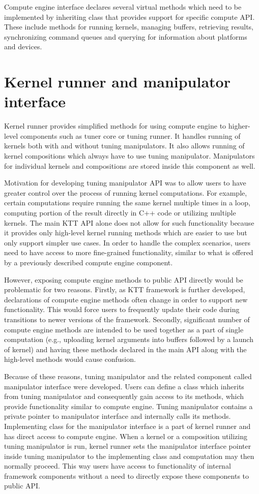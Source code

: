 \documentclass
[
    digital, %
    oneside, %
    table, %
    nolof, %
    nolot, %
    nocover %
]{fithesis3}
\begin{document}
Compute engine interface declares several virtual methods which need to be implemented by inheriting class that provides support for specific compute
API. These include methods for running kernels, managing buffers, retrieving results, synchronizing command queues and querying for information about
platforms and devices.

\section{Kernel runner and manipulator interface}
Kernel runner provides simplified methods for using compute engine to higher-level components such as tuner core or tuning runner. It handles running of
kernels both with and without tuning manipulators. It also allows running of kernel compositions which always have to use tuning manipulator. Manipulators
for individual kernels and compositions are stored inside this component as well.

Motivation for developing tuning manipulator API was to allow users to have greater control over the process of running kernel computations.
For example, certain computations require running the same kernel multiple times in a loop, computing portion of the result directly in C++ code or
utilizing multiple kernels. The main KTT API alone does not allow for such functionality because it provides only high-level kernel running methods which
are easier to use but only support simpler use cases. In order to handle the complex scenarios, users need to have access to more fine-grained
functionality, similar to what is offered by a previously described compute engine component.

However, exposing compute engine methods to public API directly would be problematic for two reasons. Firstly, as KTT framework is further developed,
declarations of compute engine methods often change in order to support new functionality. This would force users to frequently update their code
during transitions to newer versions of the framework. Secondly, significant number of compute engine methods are intended to be used together as a part
of single computation (e.g., uploading kernel arguments into buffers followed by a launch of kernel) and having these methods declared in the main API
along with the high-level methods would cause confusion.

Because of these reasons, tuning manipulator and the related component called manipulator interface were developed. Users can define a class which
inherits from tuning manipulator and consequently gain access to its methods, which provide functionality similar to compute engine. Tuning manipulator
contains a private pointer to manipulator interface and internally calls its methods. Implementing class for the manipulator interface is
a part of kernel runner and has direct access to compute engine. When a kernel or a composition utilizing tuning manipulator is run, kernel runner sets the
manipulator interface pointer inside tuning manipulator to the implementing class and computation may then normally proceed. This way users have access
to functionality of internal framework components without a need to directly expose these components to public API. 
\end{document}
